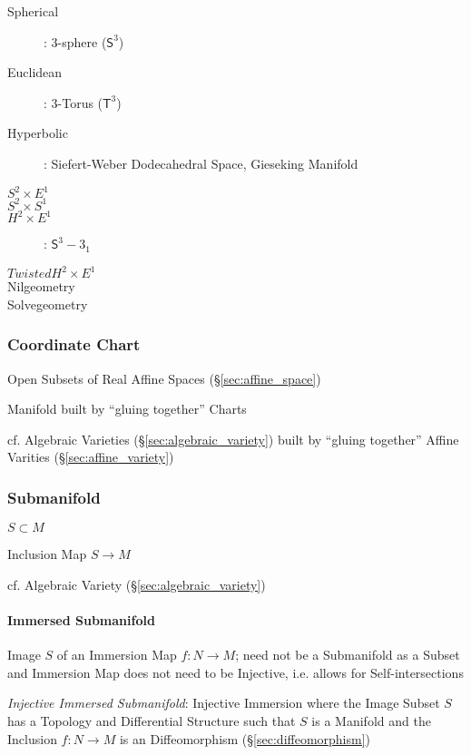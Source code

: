 \begin{description}
  \item [Spherical]: 3-sphere ($\mathsf{S}^3$)
  \item [Euclidean]: 3-Torus ($\mathsf{T}^3$)
  \item [Hyperbolic]: Siefert-Weber Dodecahedral Space, Gieseking
  Manifold
  \item [$S^2 \times E^1$]
  \item [$S^2 \times S^1$]
  \item [$H^2 \times E^1$]: $\mathsf{S}^3 - 3_1$
  \item [$Twisted H^2 \times E^1$]
  \item [Nilgeometry]
  \item [Solvegeometry]
\end{description}



\subsubsection{Coordinate Chart}\label{sec:coordinate_chart}

Open Subsets of Real Affine Spaces (\S\ref{sec:affine_space})

Manifold built by ``gluing together'' Charts

cf. Algebraic Varieties (\S\ref{sec:algebraic_variety}) built by ``gluing
together'' Affine Varities (\S\ref{sec:affine_variety})



\subsubsection{Submanifold}\label{sec:submanifold}

$S \subset M$

Inclusion Map $S \rightarrow M$

cf. Algebraic Variety (\S\ref{sec:algebraic_variety})



\paragraph{Immersed Submanifold}\label{sec:immersed_submanifold}\hfill

Image $S$ of an Immersion Map $f : N \rightarrow M$; need not be a Submanifold
as a Subset and Immersion Map does not need to be Injective, i.e. allows for
Self-intersections

\emph{Injective Immersed Submanifold}: Injective Immersion where the Image
Subset $S$ has a Topology and Differential Structure such that $S$ is a
Manifold and the Inclusion $f : N \rightarrow M$ is an Diffeomorphism
(\S\ref{sec:diffeomorphism})


